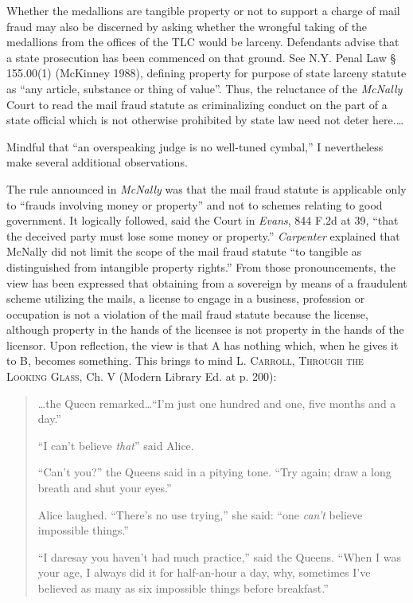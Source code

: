Whether the medallions are tangible property or not to support a charge of mail
fraud may also be discerned by asking whether the wrongful taking of the
medallions from the offices of the TLC would be larceny. Defendants advise that
a state prosecution has been commenced on that ground. See N.Y. Penal Law {\S}
155.00(1) (McKinney 1988), defining property for purpose of state larceny
statute as ``any article, substance or thing of value''. Thus, the reluctance
of the \textit{McNally} Court to read the mail fraud statute as criminalizing
conduct on the part of a state official which is not otherwise prohibited by
state law need not deter here.\ldots

Mindful that ``an overspeaking judge is no well-tuned cymbal,'' I nevertheless
make several additional observations.

The rule announced in \textit{McNally} was that the mail fraud statute is
applicable only to ``frauds involving money or property'' and not to schemes
relating to good government. It logically followed, said the Court in
\textit{Evans}, 844 F.2d at 39, ``that the deceived party must lose some money
or property.'' \textit{Carpenter }explained that McNally did not limit the
scope of the mail fraud statute ``to tangible as distinguished from intangible
property rights.'' From those pronouncements, the view has been expressed that
obtaining from a sovereign by means of a fraudulent scheme utilizing the mails,
a license to engage in a business, profession or occupation is not a violation
of the mail fraud statute because the license, although property in the hands
of the licensee is not property in the hands of the licensor. Upon reflection,
the view is that A has nothing which, when he gives it to B, becomes something.
This brings to mind \textsc{L. Carroll, Through the Looking
Glass}, Ch. V (Modern Library Ed. at p. 200):
\begin{quotation}
\ldots the Queen remarked\ldots ``I'm just one hundred and one, five months and
a
day.''

``I can't believe \textit{that}{}'' said Alice.

``Can't you?'' the Queens said in a pitying tone. ``Try again; draw a long
breath and shut your eyes.''

Alice laughed. ``There's no use trying,'' she said: ``one \textit{can't}
believe impossible things.''

``I daresay you haven't had much practice,'' said the Queens. ``When I was
your age, I always did it for half-an-hour a day, why, sometimes I've believed
as many as six impossible things before breakfast.''
\end{quotation}

